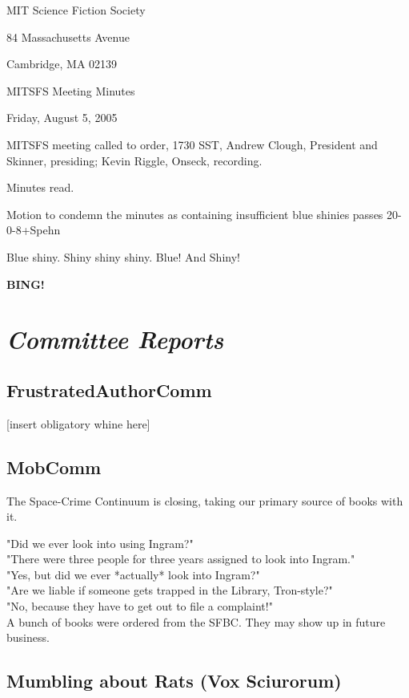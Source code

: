 \documentclass[10pt]{article}
\newcommand{\bing}{{\bf BING!} }
\newcommand{\goto}[1]{\bing \vskip 12pt \section*{{\em{#1}}}}
\begin{document}
\begin{center}

MIT Science Fiction Society

84 Massachusetts Avenue

Cambridge, MA 02139

\vspace{12pt}

MITSFS Meeting Minutes

Friday, August 5, 2005

\end{center}

\vspace{18pt}

\setlength{\parskip}{6pt}

\noindent
MITSFS meeting called to order, 1730 SST, Andrew Clough, 
President and Skinner, presiding; Kevin Riggle,  Onseck, recording.

Minutes read.

Motion to condemn the minutes as containing insufficient blue shinies passes 20-0-8+Spehn

Blue shiny.  Shiny shiny shiny.  Blue!  And Shiny!

\goto{Committee Reports}
\subsection*{FrustratedAuthorComm}
[insert obligatory whine here]

\subsection*{MobComm}
The Space-Crime Continuum is closing, taking our primary source of books with it.

"Did we ever look into using Ingram?"\\
"There were three people for three years assigned to look into Ingram."\\
"Yes, but did we ever *actually* look into Ingram?"\\

"Are we liable if someone gets trapped in the Library, Tron-style?"\\
"No, because they have to get out to file a complaint!"\\

A bunch of books were ordered from the SFBC.  They may show up in future business.

\subsection*{Mumbling about Rats (Vox Sciurorum)}
\end{document}
